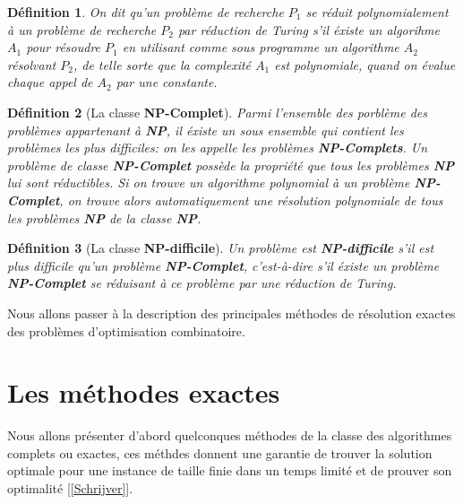 \documentclass[a4paper,11pt,oneside]{report}
\theoremstyle{plain}
\newtheorem{definition}{D\'efinition}[section]
\newcommand{\0}{/ \! \! \! 0}
\theoremstyle{plain}
\begin{document}
\begin{definition}
 On dit qu'un probl\`eme de recherche $P_1$ se r\'eduit polynomialement \`a un probl\`eme de recherche $P_2$ par r\'eduction de Turing s'il \'existe
  un algorihme $A_1$ pour r\'esoudre $P_1$ en utilisant comme sous programme un algorithme $A_2$ r\'esolvant $P_2$, de telle sorte que la complexit\'e
  $A_1$ est polynomiale, quand on \'evalue chaque appel de $A_2$ par une constante.
\end{definition}
\begin{definition}[La classe {\bf NP-Complet}]
 Parmi l'ensemble des porbl\`eme des probl\`emes appartenant \`a {\bf NP}, il \'existe un sous ensemble qui contient les probl\`emes les plus difficiles: 
 on les appelle les probl\`emes {\bf NP-Complets}. Un probl\`eme de classe {\bf NP-Complet} poss\`ede la propri\'et\'e que tous les probl\`emes {\bf NP} lui
 sont r\'eductibles. Si on trouve un algorithme polynomial \`a un probl\`eme {\bf NP-Complet}, on trouve alors automatiquement une r\'esolution polynomiale
  de tous les probl\`emes {\bf NP} de la classe {\bf NP}.
\end{definition}
\begin{definition}[La classe {\bf NP-difficile}]
 Un probl\`eme est {\bf NP-difficile} s'il est plus difficile qu'un probl\`eme {\bf NP-Complet}, c'est-\`a-dire 
 s'il \'existe un probl\`eme {\bf NP-Complet} se r\'eduisant \`a ce probl\`eme par une r\'eduction de Turing.
\end{definition}
Nous allons passer \`a la description des principales m\'ethodes de r\'esolution exactes des probl\`emes d'optimisation combinatoire.
\section{Les m\'ethodes exactes}
 Nous allons pr\'esenter d'abord quelconques m\'ethodes de la classe des algorithmes complets ou exactes, ces m\'ethdes donnent une garantie de trouver la
 solution optimale pour une instance de taille finie dans un temps limit\'e et de prouver son optimalit\'e [\ref{Schrijver}].
\end{document}
